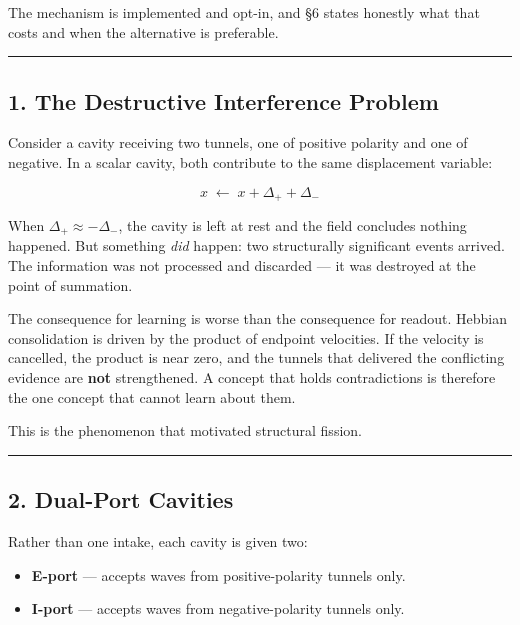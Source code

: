 \documentclass[
  11pt,
  a4paper,
]{article}
\providecommand{\tightlist}{%
  \setlength{\itemsep}{0pt}\setlength{\parskip}{0pt}}
\begin{document}
The mechanism is implemented and opt-in, and §6 states honestly what
that costs and when the alternative is preferable.

\begin{center}\rule{0.5\linewidth}{0.5pt}\end{center}

\subsection{1. The Destructive Interference
Problem}\label{the-destructive-interference-problem}

Consider a cavity receiving two tunnels, one of positive polarity and
one of negative. In a scalar cavity, both contribute to the same
displacement variable:

\[
x \;\leftarrow\; x + \Delta_{+} + \Delta_{-}
\]

When \(\Delta_{+} \approx -\Delta_{-}\), the cavity is left at rest and
the field concludes nothing happened. But something \emph{did} happen:
two structurally significant events arrived. The information was not
processed and discarded --- it was destroyed at the point of summation.

The consequence for learning is worse than the consequence for readout.
Hebbian consolidation is driven by the product of endpoint velocities.
If the velocity is cancelled, the product is near zero, and the tunnels
that delivered the conflicting evidence are \textbf{not} strengthened. A
concept that holds contradictions is therefore the one concept that
cannot learn about them.

This is the phenomenon that motivated structural fission.

\begin{center}\rule{0.5\linewidth}{0.5pt}\end{center}

\subsection{2. Dual-Port Cavities}\label{dual-port-cavities}

Rather than one intake, each cavity is given two:

\begin{itemize}
\tightlist
\item
  \textbf{E-port} --- accepts waves from positive-polarity tunnels only.
\item
  \textbf{I-port} --- accepts waves from negative-polarity tunnels only.
\end{itemize}
\end{document}
